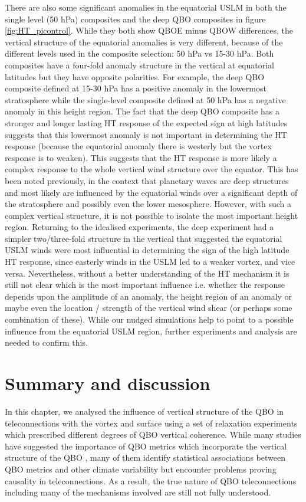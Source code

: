 There are also some significant anomalies in the equatorial USLM in both the single level (50 hPa) composites and the deep QBO composites in figure \ref{fig:HT_picontrol}. While they both show QBOE minus QBOW differences, the vertical structure of the equatorial anomalies is very different, because of the different levels used in the composite selection: 50 hPa vs 15-30 hPa. Both composites have a four-fold anomaly structure in the vertical at equatorial latitudes but they have opposite polarities. For example, the deep QBO composite defined at 15-30 hPa has a positive anomaly in the lowermost stratosphere while the single-level composite defined at 50 hPa has a negative anomaly in this height region. The fact that the deep QBO composite has a stronger and longer lasting HT response of the expected sign at high latitudes suggests that this lowermost anomaly is not important in determining the HT response (because the equatorial anomaly there is westerly but the vortex response is to weaken). This suggests that the HT response is more likely a complex response to the whole vertical wind structure over the equator. This has been noted previously, in the context that planetary waves are deep structures and most likely are influenced by the equatorial winds over a significant depth of the stratosphere and possibly even the lower mesosphere. However, with such a complex vertical structure, it is not possible to isolate the most important height region. Returning to the idealised experiments, the deep experiment had a simpler two/three-fold structure in the vertical that suggested the equatorial USLM winds were most influential in determining the sign of the high latitude HT response, since easterly winds in the USLM led to a weaker vortex, and vice versa. Nevertheless, without a better understanding of the HT mechanism it is still not clear which is the most important influence i.e. whether the response depends upon the amplitude of an anomaly, the height region of an anomaly or maybe even the location / strength of the vertical wind shear (or perhaps some combination of these). While our nudged simulations help to point to a possible influence from the equatorial USLM region, further experiments and analysis are needed to confirm this.

\section{Summary and discussion}
In this chapter, we analysed the influence of vertical structure of the QBO in teleconnections with the vortex and surface using a set of relaxation experiments which prescribed different degrees of QBO vertical coherence. While many studies have suggested the importance of QBO metrics which incorporate the vertical structure of the QBO \citep{schenzingerDefining2017, graySurface2018b, andrewsObserved2019d}, many of them identify statistical associations between QBO metrics and other climate variability but encounter problems proving causality in teleconnections. As a result, the true nature of QBO teleconnections including many of the mechanisms involved are still not fully understood. 

